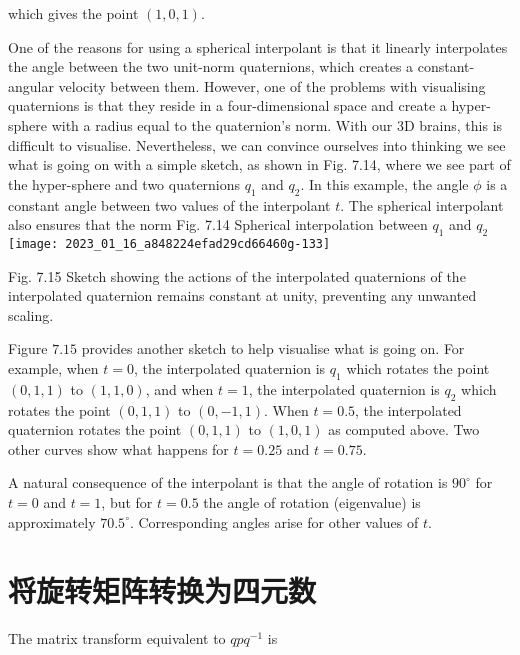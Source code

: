 which gives the point $(1,0,1)$.

One of the reasons for using a spherical interpolant is that it linearly interpolates the angle between the two unit-norm quaternions, which creates a constant-angular velocity between them. However, one of the problems with visualising quaternions is that they reside in a four-dimensional space and create a hyper-sphere with a radius equal to the quaternion's norm. With our 3D brains, this is difficult to visualise. Nevertheless, we can convince ourselves into thinking we see what is going on with a simple sketch, as shown in Fig. 7.14, where we see part of the hyper-sphere and two quaternions $q_{1}$ and $q_{2}$. In this example, the angle $\phi$ is a constant angle between two values of the interpolant $t$. The spherical interpolant also ensures that the norm Fig. 7.14 Spherical interpolation between $q_{1}$ and $q_{2}$
\texttt{[image: 2023\_01\_16\_a848224efad29cd66460g-133]}

Fig. 7.15 Sketch showing the actions of the interpolated quaternions of the interpolated quaternion remains constant at unity, preventing any unwanted scaling.

Figure $7.15$ provides another sketch to help visualise what is going on. For example, when $t=0$, the interpolated quaternion is $q_{1}$ which rotates the point $(0,1,1)$ to $(1,1,0)$, and when $t=1$, the interpolated quaternion is $q_{2}$ which rotates the point $(0,1,1)$ to $(0,-1,1)$. When $t=0.5$, the interpolated quaternion rotates the point $(0,1,1)$ to $(1,0,1)$ as computed above. Two other curves show what happens for $t=0.25$ and $t=0.75$.

A natural consequence of the interpolant is that the angle of rotation is $90^{\circ}$ for $t=0$ and $t=1$, but for $t=0.5$ the angle of rotation (eigenvalue) is approximately $70.5^{\circ}$. Corresponding angles arise for other values of $t$.

\section{将旋转矩阵转换为四元数}
The matrix transform equivalent to $q p q^{-1}$ is

